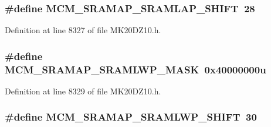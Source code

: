 \subsubsection[{\texorpdfstring{M\+C\+M\+\_\+\+S\+R\+A\+M\+A\+P\+\_\+\+S\+R\+A\+M\+L\+A\+P\+\_\+\+S\+H\+I\+FT}{MCM_SRAMAP_SRAMLAP_SHIFT}}]{\setlength{\rightskip}{0pt plus 5cm}\#define M\+C\+M\+\_\+\+S\+R\+A\+M\+A\+P\+\_\+\+S\+R\+A\+M\+L\+A\+P\+\_\+\+S\+H\+I\+FT~28}\hypertarget{group___m_c_m___register___masks_ga117a856a25e32983f5a0e2e7b561bbd9}{}\label{group___m_c_m___register___masks_ga117a856a25e32983f5a0e2e7b561bbd9}


Definition at line 8327 of file M\+K20\+D\+Z10.\+h.

\subsubsection[{\texorpdfstring{M\+C\+M\+\_\+\+S\+R\+A\+M\+A\+P\+\_\+\+S\+R\+A\+M\+L\+W\+P\+\_\+\+M\+A\+SK}{MCM_SRAMAP_SRAMLWP_MASK}}]{\setlength{\rightskip}{0pt plus 5cm}\#define M\+C\+M\+\_\+\+S\+R\+A\+M\+A\+P\+\_\+\+S\+R\+A\+M\+L\+W\+P\+\_\+\+M\+A\+SK~0x40000000u}\hypertarget{group___m_c_m___register___masks_ga0beeb7cc649b24a1dd695dac44cd9c96}{}\label{group___m_c_m___register___masks_ga0beeb7cc649b24a1dd695dac44cd9c96}


Definition at line 8329 of file M\+K20\+D\+Z10.\+h.

\subsubsection[{\texorpdfstring{M\+C\+M\+\_\+\+S\+R\+A\+M\+A\+P\+\_\+\+S\+R\+A\+M\+L\+W\+P\+\_\+\+S\+H\+I\+FT}{MCM_SRAMAP_SRAMLWP_SHIFT}}]{\setlength{\rightskip}{0pt plus 5cm}\#define M\+C\+M\+\_\+\+S\+R\+A\+M\+A\+P\+\_\+\+S\+R\+A\+M\+L\+W\+P\+\_\+\+S\+H\+I\+FT~30}\hypertarget{group___m_c_m___register___masks_gaf520c22b65ed17ceb0d1d2b157be3a17}{}\label{group___m_c_m___register___masks_gaf520c22b65ed17ceb0d1d2b157be3a17}



